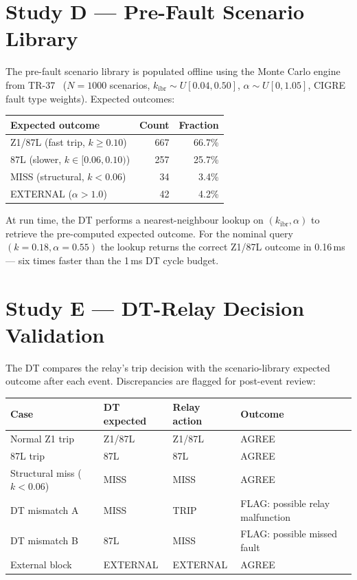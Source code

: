 \documentclass[11pt,a4paper]{article}
\begin{document}
\section{Study D --- Pre-Fault Scenario Library}
\label{sec:studyD}

The pre-fault scenario library is populated offline using the Monte Carlo
engine from TR-37~\cite{SAMBP_TR37} ($N=1000$ scenarios,
$k_\mathrm{ibr}\sim U[0.04,0.50]$, $\alpha\sim U[0,1.05]$, CIGRE fault type
weights).  Expected outcomes:

\begin{center}
\begin{tabular}{@{}lrr@{}}
\toprule
Expected outcome & Count & Fraction \\
\midrule
Z1/87L (fast trip, $k\geq0.10$) & 667 & 66.7\% \\
87L (slower, $k\in[0.06,0.10)$) & 257 & 25.7\% \\
MISS (structural, $k<0.06$) & 34 & 3.4\% \\
EXTERNAL ($\alpha>1.0$) & 42 & 4.2\% \\
\bottomrule
\end{tabular}
\end{center}

\medskip\noindent
At run time, the DT performs a nearest-neighbour lookup on $(k_\mathrm{ibr}, \alpha)$
to retrieve the pre-computed expected outcome.  For the nominal query
$(k=0.18, \alpha=0.55)$ the lookup returns the correct Z1/87L outcome in
0.16\,ms --- six times faster than the 1\,ms DT cycle budget.

\section{Study E --- DT-Relay Decision Validation}
\label{sec:studyE}

The DT compares the relay's trip decision with the scenario-library expected
outcome after each event.  Discrepancies are flagged for post-event review:

\begin{center}
\begin{tabular}{@{}llll@{}}
\toprule
Case & DT expected & Relay action & Outcome \\
\midrule
Normal Z1 trip & Z1/87L & Z1/87L & AGREE \\
87L trip & 87L & 87L & AGREE \\
Structural miss ($k<0.06$) & MISS & MISS & AGREE \\
DT mismatch A & MISS & TRIP & FLAG: possible relay malfunction \\
DT mismatch B & 87L & MISS & FLAG: possible missed fault \\
External block & EXTERNAL & EXTERNAL & AGREE \\
\bottomrule
\end{tabular}
\end{center}
\end{document}

